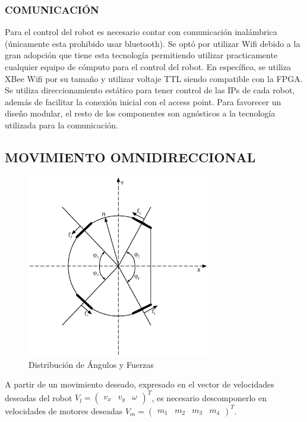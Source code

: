 \documentclass[twocolumn,10pt]{amrob}
\begin{document}
\subsubsection*{COMUNICACIÓN}
Para el control del robot es necesario contar con comunicación inalámbrica (\'unicamente esta prohibido usar bluetooth). Se opt\'o por utilizar Wifi debido a la gran adopci\'on que tiene esta tecnología permitiendo utilizar practicamente cualquier equipo de cómputo para el control del robot. En específico, se utiliza XBee Wifi por su tamaño y utilizar voltaje TTL siendo compatible con la FPGA. Se utiliza direccionamiento estático para tener control de las IPs de cada robot, además de facilitar la conexión inicial con el access point. Para favorecer un diseño modular, el resto de los componentes son agnósticos a la tecnología utilizada para la comunicación. \par %
\subsection*{MOVIMIENTO OMNIDIRECCIONAL}
\begin{figure}
  \centering
    \includegraphics[width=8cm]{anglesRobot.eps}
  \caption{Distribución de Ángulos y Fuerzas}
  \label{fig:angFzaDiag}
\end{figure}
A partir de un movimiento deseado, expresado en el vector de velocidades deseadas del robot \( V_l= \begin{pmatrix} v_x & v_y & \omega \end{pmatrix}^{T} \), es necesario descomponerlo en velocidades de motores deseadas \( V_m= \begin {pmatrix} m_1 & m_2 & m_3 & m_4 \end{pmatrix}^{T} \). 
\end{document}
